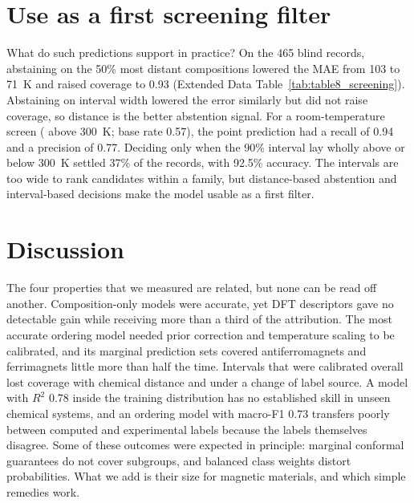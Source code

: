 \documentclass[11pt,a4paper]{article}
\begin{document}
\section*{Use as a first screening filter}\label{sec:screening}

What do such predictions support in practice? On the 465 blind records, abstaining on the 50\% most distant compositions lowered the MAE from 103 to 71~K and raised coverage to 0.93 (Extended Data Table~\ref{tab:table8_screening}). Abstaining on interval width lowered the error similarly but did not raise coverage, so distance is the better abstention signal. For a room-temperature screen (\Tc{} above 300~K; base rate 0.57), the point prediction had a recall of 0.94 and a precision of 0.77. Deciding only when the 90\% interval lay wholly above or below 300~K settled 37\% of the records, with 92.5\% accuracy. The intervals are too wide to rank candidates within a family, but distance-based abstention and interval-based decisions make the model usable as a first filter.

\section*{Discussion}\label{sec:discussion}

The four properties that we measured are related, but none can be read off another. Composition-only models were accurate, yet DFT descriptors gave no detectable gain while receiving more than a third of the attribution. The most accurate ordering model needed prior correction and temperature scaling to be calibrated, and its marginal prediction sets covered antiferromagnets and ferrimagnets little more than half the time. Intervals that were calibrated overall lost coverage with chemical distance and under a change of label source. A \Tc{} model with $R^2$ 0.78 inside the training distribution has no established skill in unseen chemical systems, and an ordering model with macro-F1 0.73 transfers poorly between computed and experimental labels because the labels themselves disagree. Some of these outcomes were expected in principle: marginal conformal guarantees do not cover subgroups, and balanced class weights distort probabilities. What we add is their size for magnetic materials, and which simple remedies work.
\end{document}
